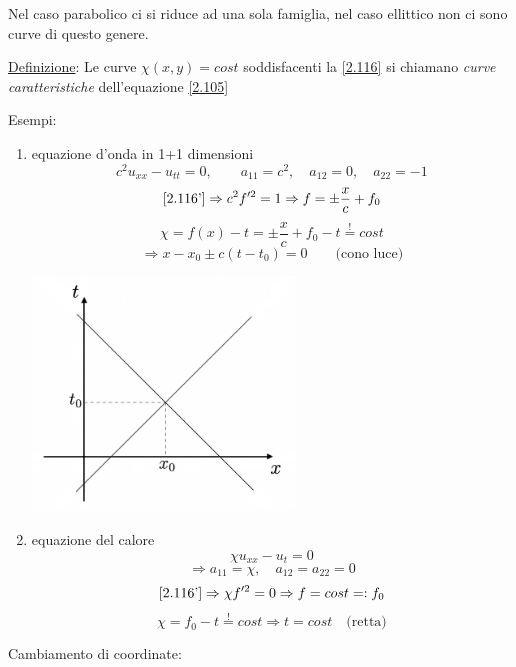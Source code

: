\documentclass[a4paper,11pt]{report}
\begin{document}
Nel caso parabolico ci si riduce ad una sola famiglia, nel caso ellittico non ci sono curve di questo genere.

\smallskip

\underline{Definizione}: Le curve $\chi(x,y)=cost$ soddisfacenti la \eqref{2.116} si chiamano \emph{curve caratteristiche} dell'equazione \eqref{2.105}

\medskip

Esempi:
\begin{enumerate}[label=(\roman*)]
\item equazione d'onda in 1+1 dimensioni
\[
c^2 u_{xx}-u_{tt}=0, \qquad a_{11}=c^2, \quad a_{12}=0, \quad a_{22}=-1
\]
\[
\eqref{2.116'}\Rightarrow c^2f'^2 =1 \Rightarrow f=\pm \frac{x}{c} + f_0
\]
\[
\chi=f(x) - t= \pm \frac{x}{c}+f_0 -t \overset{!}{=}cost
\]
\[
\Rightarrow x-x_0 \pm c(t-t_0)=0 \qquad \text{(cono luce)}
\]
\begin{center}
\includegraphics[width=0.55\textwidth]{immagini/conoluce}
\end{center}
\item equazione del calore 
\[
\chi u_{xx}- u_t=0
\]
\[
\Rightarrow a_{11}=\chi, \quad a_{12}=a_{22}=0
\]
\[
\eqref{2.116'} \Rightarrow \chi f'^2 =0 \Rightarrow f=cost=:f_0
\]
\[
\chi = f_0-t \overset{!}{=} cost \Rightarrow t = cost \quad \text{(retta)}
\]
\end{enumerate}
Cambiamento di coordinate:
\end{document}

